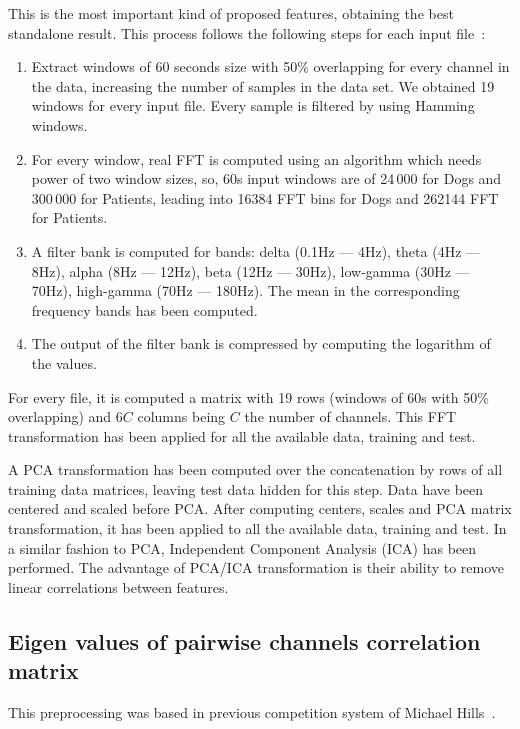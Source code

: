 \documentclass[a4paper,english,twoside]{article}
\begin{document}
This is the most important kind of proposed features, obtaining the best
standalone result. This process follows the following steps for each input
file~\cite{2014:howbert:plosone}:

\begin{enumerate}
\item
  Extract windows of 60 seconds size with 50\% overlapping for every
  channel in the data, increasing the number of samples in the data set.
  We obtained 19 windows for every input file. Every sample is filtered
  by using Hamming windows.
\item
  For every window, real FFT is computed using an algorithm which needs
  power of two window sizes, so, 60s input windows are of 24\,000 for Dogs
  and 300\,000 for Patients, leading into 16384 FFT bins for Dogs and
  262144 FFT for Patients.
\item A filter bank is computed for bands: delta (0.1Hz --- 4Hz), theta (4Hz ---
  8Hz), alpha (8Hz --- 12Hz), beta (12Hz --- 30Hz), low-gamma (30Hz --- 70Hz),
  high-gamma (70Hz --- 180Hz). The mean in the corresponding frequency bands has
  been computed.
\item
  The output of the filter bank is compressed by computing the logarithm
  of the values.
\end{enumerate}

For every file, it is computed a matrix with 19 rows (windows of 60s with 50\%
overlapping) and $6C$ columns being $C$ the number of channels. This FFT
transformation has been applied for all the available data, training and test.

A PCA transformation has been computed over the concatenation by rows of all
training data matrices, leaving test data hidden for this step. Data have been
centered and scaled before PCA. After computing centers, scales and PCA matrix
transformation, it has been applied to all the available data, training and
test. In a similar fashion to PCA, Independent Component Analysis (ICA) has
been performed. The advantage of PCA/ICA transformation is their ability to
remove linear correlations between features.

\subsection{Eigen values of pairwise channels correlation
  matrix}\label{eigen-values-of-pairwise-channels-correlation-matrix}

This preprocessing was based in previous competition system of Michael
Hills~\cite{michaelhills}.
\end{document}
